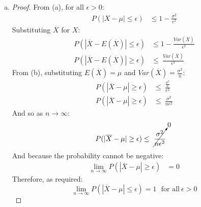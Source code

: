 \documentclass[11pt]{extarticle}
\begin{document}
\begin{enumerate}[(a)]
\begin{proof}
So: \begin{align*}Var( \overline{X} ) & = Var \left( \frac{X_1 + X_2 + \dots + X_n}{n} \right) \\
& = Var \left( \frac{X_1}{n} +  \frac{X_2}{n} + \dots +  \frac{X_n}{n} \right) \end{align*} 
Since $X_1$, $X_2$, $\dots$ , $X_n$ are independent\footnote{Assuming "independently measured" mean independent}, $Var \left( \sum_{i=1}^n (X_i) \right) = \sum_{i=1}^N Var(X_i)$, so:
 \begin{align*}
Var( \overline{X} ) & = Var \left( \frac{X_1}{n} \right) + Var \left( \frac{X_2}{n} \right) + \dots + Var \left( \frac{X_n}{n} \right) 
\end{align*} 
From $Var(aX) = a^2 Var(X)$: \begin{align*} 
Var( \overline{X} ) & = \frac{1}{n^2} Var(X_1) + \frac{1}{n^2} Var(X_2) + \dots + \frac{1}{n^2} Var(X_n)  \\
& = \frac{1}{n^2} \Big( Var(X_1) + Var(X_2) + \dots +  Var(X_n) \Big)  \\
& = \frac{1}{n^2} \Big( \sigma_1^2 + \sigma_2^2 + \dots +  \sigma_n^2 \Big)  \\
& = \frac{1}{n^2} \sigma^2(n)  = \boxed{ \frac{\sigma^2}{n} } 
\end{align*} \end{proof}
\item \begin{proof}From (a), for all $\epsilon > 0$:
\begin{align*}
P(|X - \mu| \leq \epsilon )  & \leq 1-  \frac{\sigma^2}{\epsilon^2} 
\end{align*}
Substituting $\overline{X}$ for $X$:
\begin{align*}
P(|\overline{X} - E(\overline{X})| \leq \epsilon )  & \leq 1-  \frac{Var(\overline{X})}{\epsilon^2} \\
P(|\overline{X} - E(\overline{X})| \geq \epsilon )  & \leq \ \frac{Var(\overline{X})}{\epsilon^2} 
\end{align*}
From (b), substituting $E(\overline{X}) = \mu $ and $Var(\overline{X}) = \frac{\sigma^2}{n}$:
\begin{align*}
P(|\overline{X} - \mu| \geq \epsilon )  & \leq \ \frac{\frac{\sigma^2}{n}}{\epsilon^2}   \\
P(|\overline{X} - \mu| \geq \epsilon )  & \leq \ \frac{\sigma^2}{n\epsilon^2}   
\end{align*}
And so as $n \rightarrow \infty$:
\begin{align*}
P(|\overline{X} - \mu| \geq \epsilon )  & \leq \ \cancelto{0}{\frac{\sigma^2}{n\epsilon^2}}   
\end{align*}
And because the probability cannot be negative:
\begin{align*}
\lim_{n \rightarrow \infty} P(|\overline{X} - \mu| \geq \epsilon )  & = 0   
\end{align*}
Therefore, as required: $$ \boxed{ \lim_{n \rightarrow \infty} P(|\overline{X} - \mu| \leq \epsilon ) = 1  }\ \ \ \text{for all}\ \epsilon > 0$$ \end{proof}



\end{enumerate}
\end{document}
